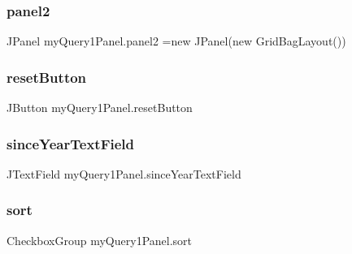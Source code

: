 \subsubsection{\texorpdfstring{panel2}{panel2}}
{\footnotesize\ttfamily J\+Panel my\+Query1\+Panel.\+panel2 =new J\+Panel(new Grid\+Bag\+Layout())\hspace{0.3cm}{\ttfamily [protected]}}

\hypertarget{classmy_query1_panel_a0e0a620150837e7d0caa3386fdd1879b}{}\label{classmy_query1_panel_a0e0a620150837e7d0caa3386fdd1879b} 
\subsubsection{\texorpdfstring{reset\+Button}{resetButton}}
{\footnotesize\ttfamily J\+Button my\+Query1\+Panel.\+reset\+Button\hspace{0.3cm}{\ttfamily [protected]}}

\hypertarget{classmy_query1_panel_a60b95255f8c6ffeb063ca97c79206c49}{}\label{classmy_query1_panel_a60b95255f8c6ffeb063ca97c79206c49} 
\subsubsection{\texorpdfstring{since\+Year\+Text\+Field}{sinceYearTextField}}
{\footnotesize\ttfamily J\+Text\+Field my\+Query1\+Panel.\+since\+Year\+Text\+Field\hspace{0.3cm}{\ttfamily [protected]}}

\hypertarget{classmy_query1_panel_a5ae5e5e6cfc109b6a15ac6811604a5c1}{}\label{classmy_query1_panel_a5ae5e5e6cfc109b6a15ac6811604a5c1} 
\subsubsection{\texorpdfstring{sort}{sort}}
{\footnotesize\ttfamily Checkbox\+Group my\+Query1\+Panel.\+sort\hspace{0.3cm}{\ttfamily [protected]}}

\hypertarget{classmy_query1_panel_ac662f986c33598e85559ac3d93f634b0}{}\label{classmy_query1_panel_ac662f986c33598e85559ac3d93f634b0} 
